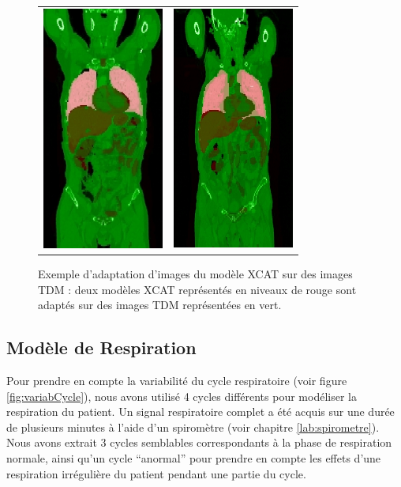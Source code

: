 \begin{figure}
 \centering
 \begin{tabular}{c c}
 \includegraphics[width=4cm]{images/adapt_bru_jea} &
 \includegraphics[width=4cm]{images/adapt_cha_chr}
 \end{tabular}
 \caption[Exemple d’adaptation d’images du modèle XCAT sur des images TDM]{ Exemple d’adaptation d’images du modèle XCAT sur des images TDM : deux modèles XCAT représentés en niveaux de rouge sont adaptés sur des images TDM représentées en vert.}
 \label{fig:adaptXCAT}
\end{figure}


\subsection{Modèle de Respiration}


Pour prendre en compte la variabilité du cycle respiratoire (voir figure \ref{fig:variabCycle}), nous avons utilisé 4 cycles différents pour modéliser la respiration du patient. Un signal respiratoire complet a été acquis sur une durée de plusieurs minutes à l'aide d'un spiromètre (voir chapitre \ref{lab:spirometre}). Nous avons extrait 3 cycles semblables correspondants à la phase de respiration normale, ainsi qu'un cycle ``anormal'' pour prendre en compte les effets d'une respiration irrégulière du patient pendant une partie du cycle.

